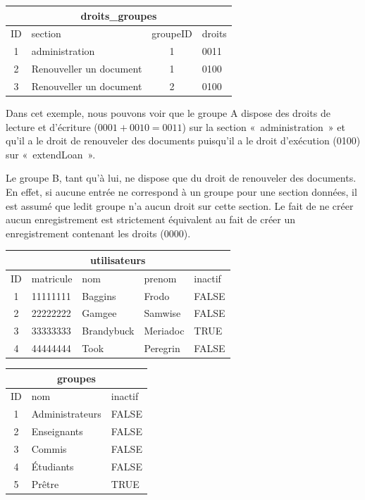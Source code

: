 \documentclass[letter, 10pt]{report}
\begin{document}
\qquad

\begin{tabular}{|c|l|c|l|}
	\hline
	\multicolumn{4}{|c|}{droits\_groupes} \\
	\hline
	ID & section                 & groupeID & droits \\
	\hline
	1  & administration          & 1        & 0011 \\
	2  & Renouveller un document & 1        & 0100 \\
	3  & Renouveller un document & 2        & 0100 \\
	\hline
\end{tabular}

Dans cet exemple, nous pouvons voir que le groupe A dispose des droits de lecture et d'écriture ($ 0001 + 0010 = 0011 $) sur la section «~administration~» et qu'il a le droit de renouveler des documents puisqu'il a le droit d'exécution (0100) sur «~extendLoan~».

Le groupe B, tant qu'à lui, ne dispose que du droit de renouveler des documents. En effet, si aucune entrée ne correspond à un groupe pour une section données, il est assumé que ledit groupe n'a aucun droit sur cette section. Le fait de ne créer aucun enregistrement est strictement équivalent au fait de créer un enregistrement contenant les droits (0000).

\begin{tabular}{|c|l|l|l|l|}
	\hline
	\multicolumn{5}{|c|}{utilisateurs} \\
	\hline
	ID & matricule & nom         & prenom   & inactif \\
	\hline
	1  & 11111111  & Baggins     & Frodo    & FALSE \\
	2  & 22222222  & Gamgee      & Samwise  & FALSE \\
	3  & 33333333  & Brandybuck  & Meriadoc & TRUE \\
	4  & 44444444  & Took        & Peregrin & FALSE \\
	\hline
\end{tabular}

\begin{tabular}{|c|l|l|}
	\hline
	\multicolumn{3}{|c|}{groupes} \\
	\hline
	ID & nom               & inactif \\
	\hline
	1  & Administrateurs   & FALSE \\
	2  & Enseignants       & FALSE \\
	3  & Commis            & FALSE \\
	4  & Étudiants         & FALSE \\
	5  & Prêtre            & TRUE \\
	\hline
\end{tabular}
\end{document}
